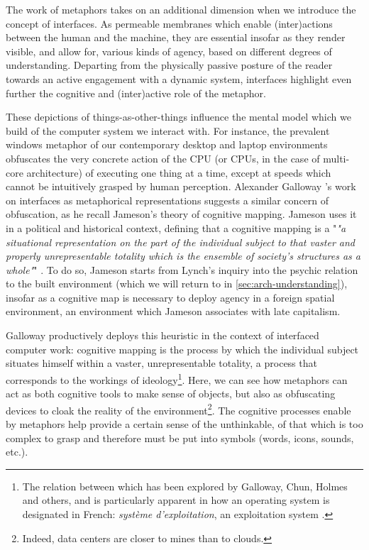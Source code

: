 The work of metaphors takes on an additional dimension when we introduce the concept of interfaces. As permeable membranes which enable (inter)actions between the human and the machine, they are essential insofar as they render visible, and allow for, various kinds of agency, based on different degrees of understanding. Departing from the physically passive posture of the reader towards an active engagement with a dynamic system, interfaces highlight even further the cognitive and (inter)active role of the metaphor.

These depictions of things-as-other-things influence the mental model which we build of the computer system we interact with. For instance, the prevalent windows metaphor of our contemporary desktop and laptop environments obfuscates the very concrete action of the CPU (or CPUs, in the case of multi-core architecture) of executing one thing at a time, except at speeds which cannot be intuitively grasped by human perception. Alexander Galloway 's work on interfaces as metaphorical representations suggests a similar concern of obfuscation, as he recall Jameson's theory of cognitive mapping. Jameson uses it in a political and historical context, defining that a cognitive mapping is a "\emph{"a situational representation on the part of the individual subject to that vaster and properly unrepresentable totality which is the ensemble of society's structures as a whole"}" \citep{jameson_postmodernism_1991}. To do so, Jameson starts from Lynch's inquiry into the psychic relation to the built environment (which we will return to in \ref{sec:arch-understanding}), insofar as a cognitive map is necessary to deploy agency in a foreign spatial environment, an environment which Jameson associates with late capitalism. 

Galloway productively deploys this heuristic in the context of interfaced computer work: cognitive mapping is the process by which the individual subject situates himself within a vaster, unrepresentable totality, a process that corresponds to the workings of ideology\footnote{The relation between which has been explored by Galloway, Chun, Holmes and others, and is particularly apparent in how an operating system is designated in French: \emph{système d'exploitation}, an exploitation system \citep{galloway_language_2006a,chun_software_2005}.}. Here, we can see how metaphors can act as both cognitive tools to make sense of objects, but also as obfuscating devices to cloak the reality of the environment\footnote{Indeed, data centers are closer to mines than to clouds.}. The cognitive processes enable by metaphors help provide a certain sense of the unthinkable, of that which is too complex to grasp and therefore must be put into symbols (words, icons, sounds, etc.).

